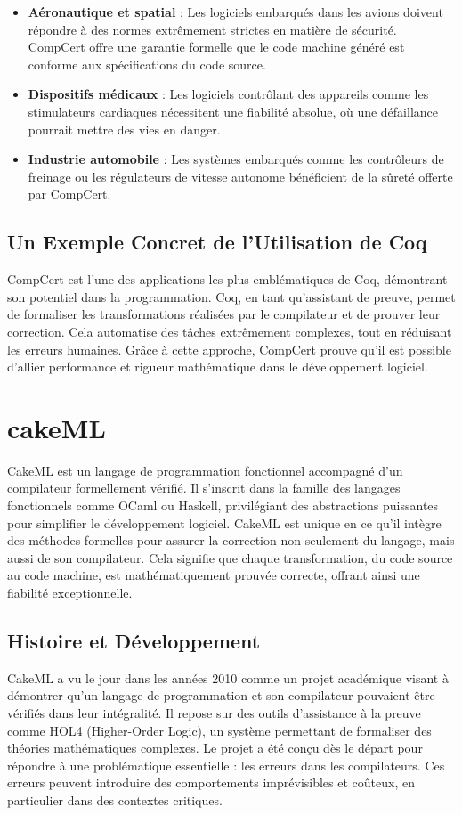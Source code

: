 \begin{itemize}
    \item \textbf{Aéronautique et spatial} : Les logiciels embarqués dans les avions doivent répondre à des normes extrêmement strictes en matière de sécurité. CompCert offre une garantie formelle que le code machine généré est conforme aux spécifications du code source.
    \item \textbf{Dispositifs médicaux} : Les logiciels contrôlant des appareils comme les stimulateurs cardiaques nécessitent une fiabilité absolue, où une défaillance pourrait mettre des vies en danger.
    \item \textbf{Industrie automobile} : Les systèmes embarqués comme les contrôleurs de freinage ou les régulateurs de vitesse autonome bénéficient de la sûreté offerte par CompCert.
\end{itemize}

\subsection{Un Exemple Concret de l’Utilisation de Coq}
CompCert est l’une des applications les plus emblématiques de Coq, démontrant son potentiel dans la programmation. Coq, en tant qu’assistant de preuve, permet de formaliser les transformations réalisées par le compilateur et de prouver leur correction. Cela automatise des tâches extrêmement complexes, tout en réduisant les erreurs humaines. Grâce à cette approche, CompCert prouve qu’il est possible d’allier performance et rigueur mathématique dans le développement logiciel.

\section{cakeML}
CakeML est un langage de programmation fonctionnel accompagné d’un compilateur formellement vérifié. Il s’inscrit dans la famille des langages fonctionnels comme OCaml ou Haskell, privilégiant des abstractions puissantes pour simplifier le développement logiciel. CakeML est unique en ce qu’il intègre des méthodes formelles pour assurer la correction non seulement du langage, mais aussi de son compilateur. Cela signifie que chaque transformation, du code source au code machine, est mathématiquement prouvée correcte, offrant ainsi une fiabilité exceptionnelle.

\subsection{Histoire et Développement}
CakeML a vu le jour dans les années 2010 comme un projet académique visant à démontrer qu’un langage de programmation et son compilateur pouvaient être vérifiés dans leur intégralité. Il repose sur des outils d’assistance à la preuve comme HOL4 (Higher-Order Logic), un système permettant de formaliser des théories mathématiques complexes. Le projet a été conçu dès le départ pour répondre à une problématique essentielle : les erreurs dans les compilateurs. Ces erreurs peuvent introduire des comportements imprévisibles et coûteux, en particulier dans des contextes critiques.

